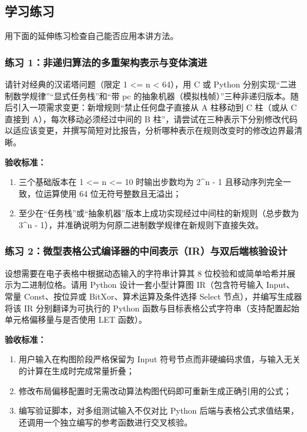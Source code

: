 \documentclass[UTF8,a4paper,11pt,fontset=fandol]{ctexart}
\begin{document}
\subsection{学习练习}

用下面的延伸练习检查自己能否应用本讲方法。

\subsubsection*{练习 1：非递归算法的多重架构表示与变体演进}

请针对经典的汉诺塔问题（限定 1 <= n < 64），用 C 或 Python 分别实现“二进制数学规律”“显式任务栈”和“带 pc 的抽象机器（模拟栈帧）”三种非递归版本。随后引入一项需求变更：新增规则“禁止任何盘子直接从 A 柱移动到 C 柱（或从 C 直接到 A），每次移动必须经过中间的 B 柱”，请尝试在三种表示下分别修改代码以适应该变更，并撰写简短对比报告，分析哪种表示在规则改变时的修改边界最清晰。

\par{}\textbf{验收标准：}

\begin{enumerate}
\item 三个基础版本在 1 <= n <= 10 时输出步数均为 2\textasciicircum{}n - 1 且移动序列完全一致，位运算使用 64 位无符号整数且无溢出；

\item 至少在“任务栈”或“抽象机器”版本上成功实现经过中间柱的新规则（总步数为 3\textasciicircum{}n - 1），并准确说明为何原二进制数学规律在新规则下直接失效。
\end{enumerate}

\subsubsection*{练习 2：微型表格公式编译器的中间表示（IR）与双后端核验设计}

设想需要在电子表格中根据动态输入的字符串计算其 8 位校验和或简单哈希并展示为二进制位格。请用 Python 设计一套小型计算图 IR（包含符号输入 Input、常量 Const、按位异或 BitXor、算术运算及条件选择 Select 节点），并编写生成器将该 IR 分别翻译为可执行的 Python 函数与目标表格公式字符串（支持配置起始单元格偏移量与是否使用 LET 函数）。

\par{}\textbf{验收标准：}

\begin{enumerate}
\item 用户输入在构图阶段严格保留为 Input 符号节点而非硬编码求值，与输入无关的计算在生成时完成常量折叠；

\item 修改布局偏移配置时无需改动算法构图代码即可重新生成正确引用的公式；

\item 编写验证脚本，对多组测试输入不仅对比 Python 后端与表格公式求值结果，还调用一个独立编写的参考函数进行交叉核验。
\end{enumerate}
\end{document}
